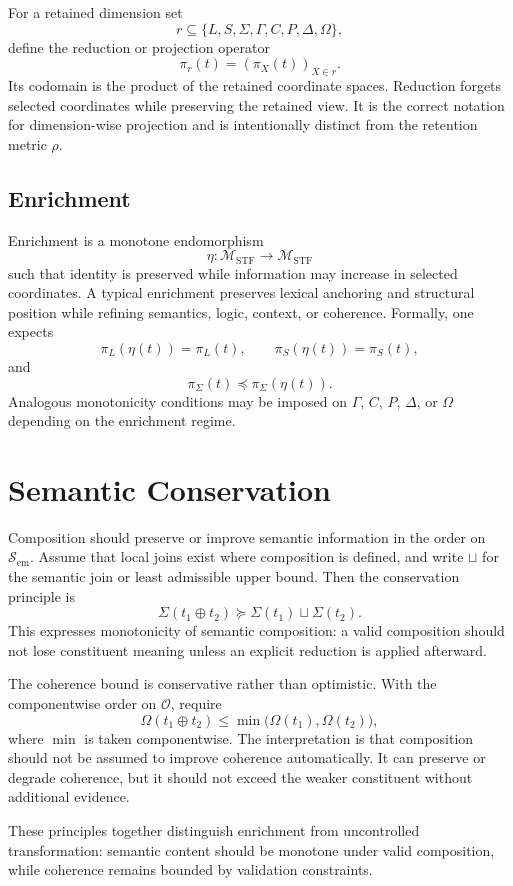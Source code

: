 \documentclass{article}
\newcommand{\Sem}{\mathcal{S}_{\mathrm{em}}}
\newcommand{\Coh}{\mathcal{O}}
\newcommand{\Manifold}{\mathcal{M}_{\mathrm{STF}}}
\begin{document}
For a retained dimension set
\[
r \subseteq \{L,S,\Sigma,\Gamma,C,P,\Delta,\Omega\},
\]
define the reduction or projection operator
\[
\pi_r(t) = (\pi_X(t))_{X \in r}.
\]
Its codomain is the product of the retained coordinate spaces. Reduction forgets selected coordinates while preserving the retained view. It is the correct notation for dimension-wise projection and is intentionally distinct from the retention metric \(\rho\).

\subsection*{Enrichment}

Enrichment is a monotone endomorphism
\[
\eta : \Manifold \to \Manifold
\]
such that identity is preserved while information may increase in selected coordinates. A typical enrichment preserves lexical anchoring and structural position while refining semantics, logic, context, or coherence. Formally, one expects
\[
\pi_L(\eta(t)) = \pi_L(t),
\qquad
\pi_S(\eta(t)) = \pi_S(t),
\]
and
\[
\pi_\Sigma(t) \preceq \pi_\Sigma(\eta(t)).
\]
Analogous monotonicity conditions may be imposed on \(\Gamma\), \(C\), \(P\), \(\Delta\), or \(\Omega\) depending on the enrichment regime.

\section{Semantic Conservation}

Composition should preserve or improve semantic information in the order on \(\Sem\). Assume that local joins exist where composition is defined, and write \(\sqcup\) for the semantic join or least admissible upper bound. Then the conservation principle is
\[
\Sigma(t_1 \oplus t_2) \succeq \Sigma(t_1) \sqcup \Sigma(t_2).
\]
This expresses monotonicity of semantic composition: a valid composition should not lose constituent meaning unless an explicit reduction is applied afterward.

The coherence bound is conservative rather than optimistic. With the componentwise order on \(\Coh\), require
\[
\Omega(t_1 \oplus t_2) \le \min\bigl(\Omega(t_1), \Omega(t_2)\bigr),
\]
where \(\min\) is taken componentwise. The interpretation is that composition should not be assumed to improve coherence automatically. It can preserve or degrade coherence, but it should not exceed the weaker constituent without additional evidence.

These principles together distinguish enrichment from uncontrolled transformation: semantic content should be monotone under valid composition, while coherence remains bounded by validation constraints.
\end{document}
